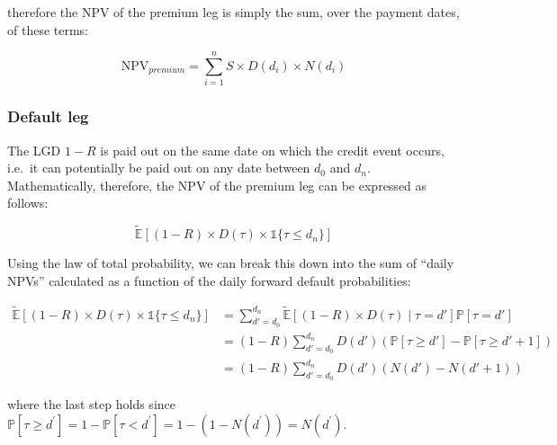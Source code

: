 \documentclass[11pt]{article}
\begin{document}
therefore the NPV of the premium leg is simply the sum, over the payment
dates, of these terms:

\[\textrm{NPV}_{premium} = \sum_{i=1}^{n} S \times D(d_i) \times N(d_i)\]

\subsubsection{Default leg}\label{default-leg}

The LGD \(1-R\) is paid out on the same date on which the credit event
occurs, i.e.~it can potentially be paid out on any date between \(d_0\)
and \(d_n\). Mathematically, therefore, the NPV of the premium leg can
be expressed as follows:

\[
\tilde{\mathbb{E}}[(1-R) \times D(\tau) \times \mathbb{1} \{\tau \leq d_n\} ]
\]

Using the law of total probability, we can break this down into the sum
of ``daily NPVs'' calculated as a function of the daily forward default
probabilities:

\[
\begin{align*}
\tilde{\mathbb{E}}[(1-R) \times D(\tau) \times \mathbb{1}\{\tau \leq d_n\} ]
&= \sum_{d'=d_0}^{d_n} \tilde{\mathbb{E}}[ (1-R) \times D(\tau) \mid \tau = d'] \mathbb{P}[ \tau = d' ] \\
&= (1-R) \sum_{d'=d_0}^{d_n} D(d') \left( \mathbb{P}[ \tau \geq d' ] - \mathbb{P}[ \tau \geq d'+1 ] \right) \\
&= (1-R) \sum_{d'=d_0}^{d_n} D(d') \left( N(d') - N(d'+1) \right)
\end{align*}
\]

where the last step holds since $\mathbb{P}[\tau\geq d^{'}] = 1 - \mathbb{P}[\tau < d^{'}] = 1 - (1-N(d^{'})) = N(d^{'})$.
\end{document}
